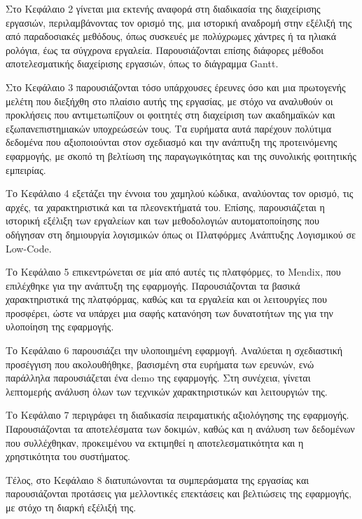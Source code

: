 		Στο Κεφάλαιο 2 γίνεται μια εκτενής αναφορά στη διαδικασία της διαχείρισης εργασιών, περιλαμβάνοντας τον ορισμό της, μια ιστορική αναδρομή στην εξέλιξή της από παραδοσιακές μεθόδους, όπως συσκευές με πολύχρωμες χάντρες ή τα ηλιακά ρολόγια, έως τα σύγχρονα εργαλεία. Παρουσιάζονται επίσης διάφορες μέθοδοι αποτελεσματικής διαχείρισης εργασιών, όπως το διάγραμμα Gantt.

		Στο Κεφάλαιο 3 παρουσιάζονται τόσο υπάρχουσες έρευνες όσο και μια πρωτογενής μελέτη που διεξήχθη στο πλαίσιο αυτής της εργασίας, με στόχο να αναλυθούν οι προκλήσεις που αντιμετωπίζουν οι φοιτητές στη διαχείριση των ακαδημαϊκών και εξωπανεπιστημιακών υποχρεώσεών τους. Τα ευρήματα αυτά παρέχουν πολύτιμα δεδομένα που αξιοποιούνται στον σχεδιασμό και την ανάπτυξη της προτεινόμενης εφαρμογής, με σκοπό τη βελτίωση της παραγωγικότητας και της συνολικής φοιτητικής εμπειρίας.

		Το Κεφάλαιο 4 εξετάζει την έννοια του χαμηλού κώδικα, αναλύοντας τον ορισμό, τις αρχές, τα χαρακτηριστικά και τα πλεονεκτήματά του. Επίσης, παρουσιάζεται η ιστορική εξέλιξη των εργαλείων και των μεθοδολογιών αυτοματοποίησης που οδήγησαν στη δημιουργία λογισμικών όπως οι Πλατφόρμες Ανάπτυξης Λογισμικού σε Low-Code.

		Το Κεφάλαιο 5 επικεντρώνεται σε μία από αυτές τις πλατφόρμες, το Mendix, που επιλέχθηκε για την ανάπτυξη της εφαρμογής. Παρουσιάζονται τα βασικά χαρακτηριστικά της πλατφόρμας, καθώς και τα εργαλεία και οι λειτουργίες που προσφέρει, ώστε να υπάρχει μια σαφής κατανόηση των δυνατοτήτων της για την υλοποίηση της εφαρμογής.

		Το Κεφάλαιο 6 παρουσιάζει την υλοποιημένη εφαρμογή. Αναλύεται η σχεδιαστική προσέγγιση που ακολουθήθηκε, βασισμένη στα ευρήματα των ερευνών, ενώ παράλληλα παρουσιάζεται ένα demo της εφαρμογής. Στη συνέχεια, γίνεται λεπτομερής ανάλυση όλων των τεχνικών χαρακτηριστικών και λειτουργιών της.

		Το Κεφάλαιο 7 περιγράφει τη διαδικασία πειραματικής αξιολόγησης της εφαρμογής. Παρουσιάζονται τα αποτελέσματα των δοκιμών, καθώς και η ανάλυση των δεδομένων που συλλέχθηκαν, προκειμένου να εκτιμηθεί η αποτελεσματικότητα και η χρηστικότητα του συστήματος.

		Τέλος, στο Κεφάλαιο 8 διατυπώνονται τα συμπεράσματα της εργασίας και παρουσιάζονται προτάσεις για μελλοντικές επεκτάσεις και βελτιώσεις της εφαρμογής, με στόχο τη διαρκή εξέλιξή της.
